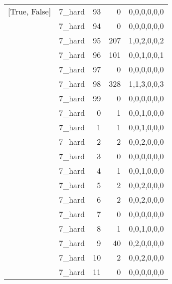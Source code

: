 \begin{tabular}{llrrl}
 [True, False]   & 7\_hard              &            93 &                     0 & 0,0,0,0,0,0   \\
 [True, False]   & 7\_hard              &            94 &                     0 & 0,0,0,0,0,0   \\
 [True, False]   & 7\_hard              &            95 &                   207 & 1,0,2,0,0,2   \\
 [True, False]   & 7\_hard              &            96 &                   101 & 0,0,1,0,0,1   \\
 [True, False]   & 7\_hard              &            97 &                     0 & 0,0,0,0,0,0   \\
 [True, False]   & 7\_hard              &            98 &                   328 & 1,1,3,0,0,3   \\
 [True, False]   & 7\_hard              &            99 &                     0 & 0,0,0,0,0,0   \\
 [True, False]   & 7\_hard              &             0 &                     1 & 0,0,1,0,0,0   \\
 [True, False]   & 7\_hard              &             1 &                     1 & 0,0,1,0,0,0   \\
 [True, False]   & 7\_hard              &             2 &                     2 & 0,0,2,0,0,0   \\
 [True, False]   & 7\_hard              &             3 &                     0 & 0,0,0,0,0,0   \\
 [True, False]   & 7\_hard              &             4 &                     1 & 0,0,1,0,0,0   \\
 [True, False]   & 7\_hard              &             5 &                     2 & 0,0,2,0,0,0   \\
 [True, False]   & 7\_hard              &             6 &                     2 & 0,0,2,0,0,0   \\
 [True, False]   & 7\_hard              &             7 &                     0 & 0,0,0,0,0,0   \\
 [True, False]   & 7\_hard              &             8 &                     1 & 0,0,1,0,0,0   \\
 [True, False]   & 7\_hard              &             9 &                    40 & 0,2,0,0,0,0   \\
 [True, False]   & 7\_hard              &            10 &                     2 & 0,0,2,0,0,0   \\
 [True, False]   & 7\_hard              &            11 &                     0 & 0,0,0,0,0,0   \\

\end{tabular}
